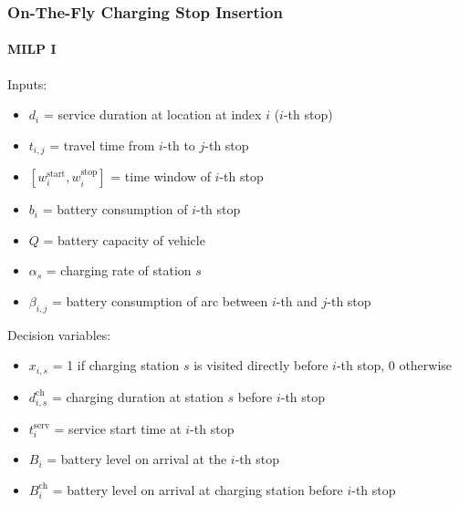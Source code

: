 \documentclass[aspectratio=1610]{beamer}
\begin{document}
\begin{frame}[noframenumbering]
	\frametitle{On-The-Fly Charging Stop Insertion}
	\framesubtitle{MILP I}
	
Inputs:
\begin{itemize}
	\item $d_i$ = service duration at location at index $i$ ($i$-th stop)
	\item $t_{i, j}$ = travel time from $i$-th to $j$-th stop %
	\item $[w^{\mathrm{start}}_i, w^{\mathrm{stop}}_i]$ = time window of $i$-th stop %
	\item $b_i$ = battery consumption of $i$-th stop 
	\item $Q$ = battery capacity of vehicle 
	\item $\alpha_s$ = charging rate of station $s$
	\item $\beta_{i,j}$ = battery consumption of arc between $i$-th and $j$-th stop %
\end{itemize}

Decision variables:
\begin{itemize}
	\item $x_{i, s}$ = 1 if charging station $s$ is visited directly before $i$-th stop, 0 otherwise
	\item $d^\mathrm{ch}_{i,s}$ = charging duration at station $s$ before $i$-th stop 
	\item $t^\mathrm{serv}_i$ = service start time at $i$-th stop %
	\item $B_i$ = battery level on arrival at the $i$-th stop
	\item $B_i^\mathrm{ch}$ = battery level on arrival at charging station before $i$-th stop
\end{itemize}
	
\end{frame}
\end{document}
